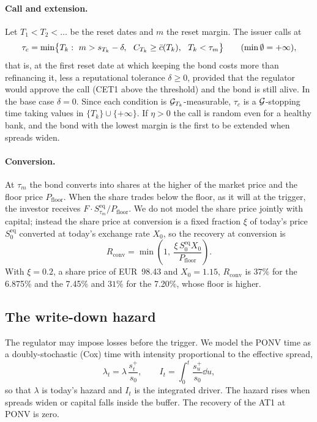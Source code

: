 \paragraph{Call and extension.} Let $T_1<T_2<\dots$ be the reset dates and $m$ the reset
margin. The issuer calls at
\begin{equation}\label{eq:call}
  \tau_c = \min\bigl\{T_k:\ m> s_{T_k}-\delta,\ \ C_{T_k}\ge\cmda(T_k),\ \ T_k<\tau_m\bigr\}
  \qquad(\min\emptyset=+\infty),
\end{equation}
that is, at the first reset date at which keeping the bond costs more than refinancing
it, less a reputational tolerance $\delta\ge0$, provided that the regulator would approve
the call (CET1 above the threshold) and the bond is still alive. In the base case
$\delta=0$. Since each condition is $\mathcal{G}_{T_k}$-measurable, $\tau_c$ is a $\mathcal{G}$-stopping
time taking values in $\{T_k\}\cup\{+\infty\}$. If $\eta>0$ the call is random even for a
healthy bank, and the bond with the lowest margin is the first to be extended when
spreads widen.

\paragraph{Conversion.} At $\tau_m$ the bond converts into shares at the higher of the
market price and the floor price $P_{\mathrm{floor}}$. When the share trades below the
floor, as it will at the trigger, the investor receives
$F\cdot S^{\mathrm{eq}}_{\tau_m}/P_{\mathrm{floor}}$. We do not model the share price
jointly with capital; instead the share price at conversion is a fixed fraction $\xi$ of
today's price $S^{\mathrm{eq}}_0$ converted at today's exchange rate $X_0$, so the recovery
at conversion is
\begin{equation}\label{eq:conv}
  R_{\mathrm{conv}}=\min\!\left(1,\ \frac{\xi\,S^{\mathrm{eq}}_0X_0}{P_{\mathrm{floor}}}\right).
\end{equation}
With $\xi=0.2$, a share price of EUR~98.43 and $X_0=1.15$, $R_{\mathrm{conv}}$ is $37\%$
for the 6.875\% and the 7.45\% and $31\%$ for the 7.20\%, whose floor is higher.

\subsection{The write-down hazard}\label{sec:hazard}

The regulator may impose losses before the trigger. We model the PONV time as a
doubly-stochastic (Cox) time with intensity proportional to the effective spread,
\begin{equation}\label{eq:hazard}
  \lambda_t = \lambda\,\frac{s_t^+}{s_0},\qquad
  I_t=\int_0^t\frac{s_u^+}{s_0}\dd u ,
\end{equation}
so that $\lambda$ is today's hazard and $I_t$ is the integrated driver. The hazard rises
when spreads widen or capital falls inside the buffer. The recovery of the AT1 at PONV is
zero.

